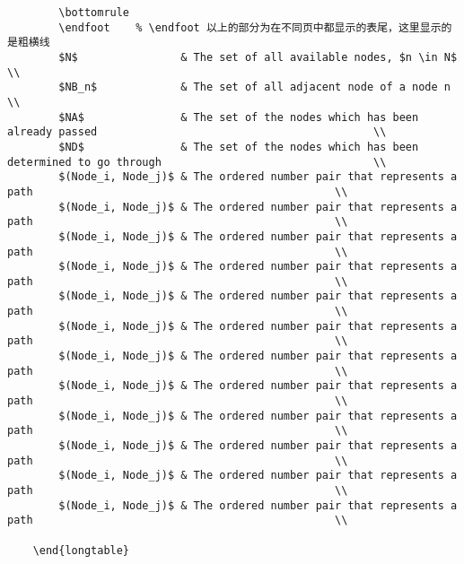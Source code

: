 \documentclass{nitthesis}
\begin{document}
\begin{lstlisting}
        \bottomrule 
        \endfoot    % \endfoot 以上的部分为在不同页中都显示的表尾，这里显示的是粗横线
        $N$                & The set of all available nodes, $n \in N$                                                    \\
        $NB_n$             & The set of all adjacent node of a node n                                                     \\
        $NA$               & The set of the nodes which has been already passed                                           \\
        $ND$               & The set of the nodes which has been determined to go through                                 \\
        $(Node_i, Node_j)$ & The ordered number pair that represents a path                                               \\
        $(Node_i, Node_j)$ & The ordered number pair that represents a path                                               \\
        $(Node_i, Node_j)$ & The ordered number pair that represents a path                                               \\
        $(Node_i, Node_j)$ & The ordered number pair that represents a path                                               \\
        $(Node_i, Node_j)$ & The ordered number pair that represents a path                                               \\
        $(Node_i, Node_j)$ & The ordered number pair that represents a path                                               \\
        $(Node_i, Node_j)$ & The ordered number pair that represents a path                                               \\
        $(Node_i, Node_j)$ & The ordered number pair that represents a path                                               \\
        $(Node_i, Node_j)$ & The ordered number pair that represents a path                                               \\
        $(Node_i, Node_j)$ & The ordered number pair that represents a path                                               \\
        $(Node_i, Node_j)$ & The ordered number pair that represents a path                                               \\
        $(Node_i, Node_j)$ & The ordered number pair that represents a path                                               \\

    \end{longtable}
\end{lstlisting}
\linespread{1.5}
\end{document}
